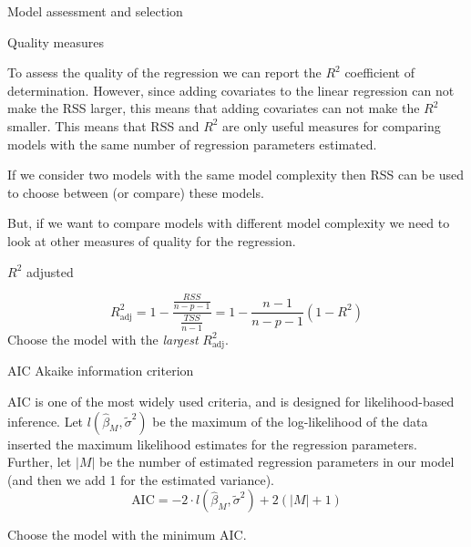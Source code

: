 \documentclass[ignorenonframetext,]{beamer}
\begin{document}
\begin{frame}

\begin{block}{Model assessment and selection}

\begin{block}{Quality measures}

To assess the quality of the regression we can report the \(R^2\)
coefficient of determination. However, since adding covariates to the
linear regression can not make the RSS larger, this means that adding
covariates can not make the \(R^2\) smaller. This means that RSS and
\(R^2\) are only useful measures for comparing models with the same
number of regression parameters estimated.

If we consider two models with the same model complexity then RSS can be
used to choose between (or compare) these models.

But, if we want to compare models with different model complexity we
need to look at other measures of quality for the regression.

\end{block}

\end{block}

\end{frame}

\begin{frame}

\begin{block}{\(R^2\) adjusted}

\[R^2_{\text{adj}}=1-\frac{\frac{RSS}{n-p-1}}{\frac{TSS}{n-1}}=1-\frac{n-1}{n-p-1}(1-R^2)\]
Choose the model with the \emph{largest} \(R^2_{\text{adj}}\).

\end{block}

\end{frame}

\begin{frame}

\begin{block}{AIC Akaike information criterion}

AIC is one of the most widely used criteria, and is designed for
likelihood-based inference. Let \(l(\hat{\beta}_M,\tilde{\sigma}^2)\) be
the maximum of the log-likelihood of the data inserted the maximum
likelihood estimates for the regression parameters. Further, let
\(\lvert M \rvert\) be the number of estimated regression parameters in
our model (and then we add 1 for the estimated variance).
\[\text{AIC} =-2 \cdot l(\hat{\beta}_M,\tilde{\sigma}^2)+2(\lvert M\rvert +1)\]

Choose the model with the minimum AIC.

\end{block}

\end{frame}
\end{document}
